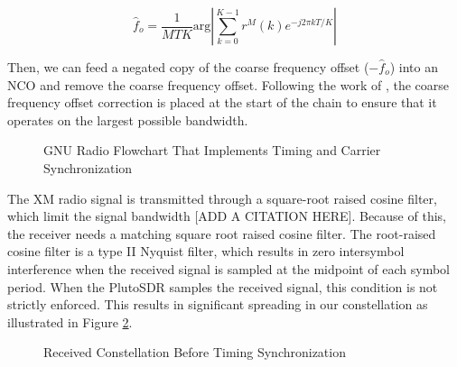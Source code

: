 \documentclass[conference,onecolumn]{IEEEtran}
\begin{document}
\begin{equation}
	\hat{f}_o = \frac{1}{MTK}\text{arg}\left|\sum_{k=0}^{K-1}{r^M(k)e^{-j2{\pi}kT/K}}\right|
\end{equation}

\noindent Then, we can feed a negated copy of the coarse frequency offset ($-\hat{f}_o$) into an NCO and remove the coarse frequency offset. Following the work of \cite{collins_2018_softwaredefined}, the coarse frequency offset correction is placed at the start of the chain to ensure that it operates on the largest possible bandwidth.
 
\begin{figure}[H]
	\centerline{}
	\caption{GNU Radio Flowchart That Implements Timing and Carrier Synchronization}
	\label{fig::timing_carrier_sync}
\end{figure}

The XM radio signal is transmitted through a square-root raised cosine filter, which limit the signal bandwidth [ADD A CITATION HERE]. Because of this, the receiver needs a matching square root raised cosine filter. The root-raised cosine filter is a type II Nyquist filter, which results in zero intersymbol interference when the received signal is sampled at the midpoint of each symbol period. When the PlutoSDR samples the received signal, this condition is not strictly enforced. This results in significant spreading in our constellation as illustrated in Figure \ref{fig::constellation_no_timing_comp}.

\begin{figure}[H]
	\centerline{}
	\caption{Received Constellation Before Timing Synchronization}
	\label{fig::constellation_no_timing_comp}
\end{figure}
\end{document}
